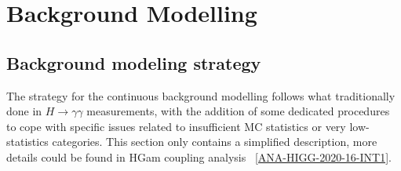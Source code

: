 \section{Background Modelling}
\label{sec:background_model}



\subsection{Background modeling strategy}
\label{ssec:bkg_strategy}

The strategy for the continuous background modelling follows what traditionally done in $H\to\gamma\gamma$ measurements, with the addition of some dedicated procedures to cope with specific issues related to insufficient MC statistics or very low-statistics categories. This section only contains a simplified description, more details could be found in HGam coupling analysis ~\ref{ANA-HIGG-2020-16-INT1}. 

